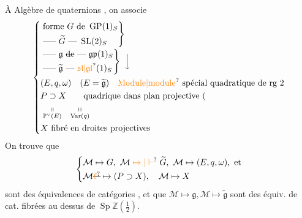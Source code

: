 À Algèbre de quaternions , on associe
\[
\left\{\begin{aligned}
 &\left.\begin{aligned}
 &\text{forme }G\text{ de }\operatorname{GP}(1)_S\\
 &\text{----- }\widetilde G\text{ --- }\operatorname{SL}(2)_S
 \end{aligned}\right\}\\[-2pt]
 &\left.\begin{aligned}
 &\text{----- }\mathfrak g\ \deleted{\text{de}}\text{ --- }\mathfrak{gp}(1)_S\\
 &\text{----- }\widetilde{\mathfrak g}\text{ --- }\unsure{\mathfrak{sl}|\mathfrak{gl}}(1)_S
 \end{aligned}\right\}\ \Big\downarrow\\
 &(E,q,\omega)\quad(E=\widetilde{\mathfrak g})\quad
 \text{\unsure{Module|module} spécial quadratique de rg 2}\\
 &P\supset X\qquad\text{quadrique dans plan projective (}\\
 &\underset{\mathbb P^\vee(E)}{\shortparallel}\quad
 \underset{\operatorname{Var}(q)}{\shortparallel}\\
 &X\text{ fibré en droites projectives}
\end{aligned}\right.
\]
On trouve que
\[
 \left\{\begin{aligned}
 &\mathcal M\mapsto G,\ \mathcal M\mathrel{\unsure{\mapsto|\vdash}}\widetilde G,\
 \mathcal M\mapsto(E,q,\omega),\ \text{et}\\
 &\mathcal M\deleted{\unsure{\ell}}\mapsto(P\supset X),\quad\mathcal M\mapsto X
 \end{aligned}\right.
\]
sont des équivalences de catégories , et que $\mathcal M\mapsto\mathfrak g,\mathcal M\mapsto\widetilde{\mathfrak g}$ sont des équiv. de cat. fibrées au dessus de $\operatorname{Sp}\mathbb Z(\tfrac12)$.

